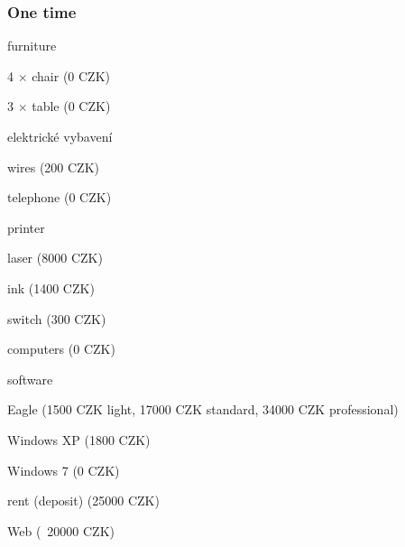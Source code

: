 \documentclass[a4paper,twoside,15pt]{book}
\begin{document}
                \subsubsection{One time}
                    \begin{dinglist}{73}
                        \item furniture
                            \begin{dinglist}{75}
                                \item 4 $\times$ chair (0 CZK)
                                \item 3 $\times$ table (0 CZK)
                            \end{dinglist}
                        \item elektrické vybavení
                            \begin{dinglist}{75}
                                \item wires (200 CZK)
                                \item telephone (0 CZK)
                                \item printer
                                    \begin{dinglist}{77}
                                        \item laser (8000 CZK)
                                        \item ink (1400 CZK)
                                    \end{dinglist}
                                \item switch (300 CZK)
                                \item computers (0 CZK)
                            \end{dinglist}
                        \item software
                            \begin{dinglist}{75}
                                \item Eagle (1500 CZK light, 17000 CZK standard, 34000 CZK professional)
                                \item Windows XP (1800 CZK)
                                \item Windows 7 (0 CZK)
                            \end{dinglist}
                        \item rent (deposit) (25000 CZK)
                        \item Web (~20000 CZK)
                    \end{dinglist}
\end{document}
